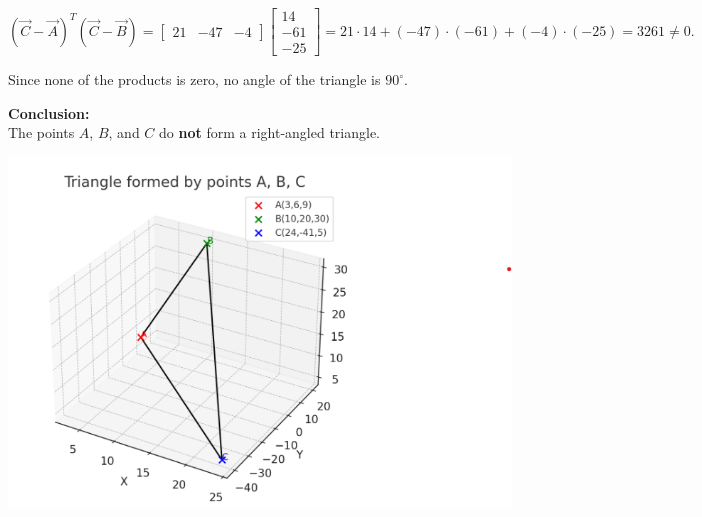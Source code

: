 \documentclass[journal]{IEEEtran}
\begin{document}
\begin{equation}
(\vec{C}-\vec{A})^{\!T}(\vec{C}-\vec{B})
=
\begin{bmatrix}21&-47&-4\end{bmatrix}
\begin{bmatrix}14\\-61\\-25\end{bmatrix}
=
21\cdot14+(-47)\cdot(-61)+(-4)\cdot(-25)
=3261 \neq 0.
\tag{5}
\end{equation}

Since none of the products is zero, no angle of the triangle is $90^\circ$.


\bigskip

\textbf{Conclusion:} \\
The points $A$, $B$, and $C$ do \textbf{not} form a right-angled triangle.
\begin{center}
    \includegraphics[width=0.8\columnwidth]{figs/plot3.png}
\end{center}
\end{document}

